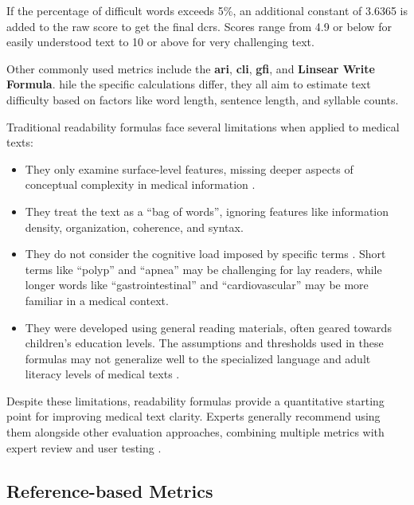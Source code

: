 If the percentage of difficult words exceeds 5\%, an additional constant of 3.6365 is added to the raw score to get the final \gls{dcrs}. Scores range from 4.9 or below for easily understood text to 10 or above for very challenging text.

Other commonly used metrics include the \textbf{\gls{ari}}, \textbf{\gls{cli}}, \textbf{\gls{gfi}}, and \textbf{Linsear Write Formula}. 
hile the specific calculations differ, they all aim to estimate text difficulty based on factors like word length, sentence length, and syllable counts.

Traditional readability formulas face several limitations when applied to medical texts:

\begin{itemize}
    \item They only examine surface-level features, missing deeper aspects of conceptual complexity in medical information \cite{Crossley2022, WANG2013503, Singh2024}.
    
    \item They treat the text as a ``bag of words'', ignoring features like information density, organization, coherence, and syntax.
    
    \item They do not consider the cognitive load imposed by specific terms \cite{Swanson2024}. Short terms like ``polyp'' and ``apnea'' may be challenging for lay readers, while longer words like ``gastrointestinal'' and ``cardiovascular'' may be more familiar in a medical context.
    
    \item They were developed using general reading materials, often geared towards children's education levels. The assumptions and thresholds used in these formulas may not generalize well to the specialized language and adult literacy levels of medical texts \cite{Crossley2022}.

\end{itemize}

Despite these limitations, readability formulas provide a quantitative starting point for improving medical text clarity. Experts generally recommend using them alongside other evaluation approaches, combining multiple metrics with expert review and user testing \cite{Ko2024-dd, tanprasert-kauchak-2021-flesch}.

\subsection{Reference-based Metrics}

